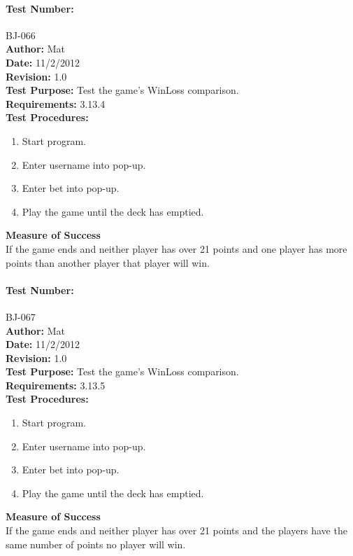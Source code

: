 \documentclass{article}
\begin{document}
\paragraph{Test Number:} BJ-066\\
\textbf{Author:} Mat\\
\textbf{Date:} 11/2/2012\\
\textbf{Revision:} 1.0\\
\textbf{Test Purpose:} Test the game's WinLoss comparison.\\
\textbf{Requirements:} 3.13.4 \\
\textbf{Test Procedures:} 
\begin{enumerate}
\item Start program.
\item Enter username into pop-up.
\item Enter bet into pop-up.
\item Play the game until the deck has emptied.
\end{enumerate}
\textbf{Measure of Success}\\If the game ends and neither player has over 21 points and one player has more points than another player that player will win.
\paragraph{Test Number:} BJ-067\\
\textbf{Author:} Mat\\
\textbf{Date:} 11/2/2012\\
\textbf{Revision:} 1.0\\
\textbf{Test Purpose:} Test the game's WinLoss comparison.\\
\textbf{Requirements:} 3.13.5 \\
\textbf{Test Procedures:} 
\begin{enumerate}
\item Start program.
\item Enter username into pop-up.
\item Enter bet into pop-up.
\item Play the game until the deck has emptied.
\end{enumerate}
\textbf{Measure of Success}\\If the game ends and neither player has over 21 points and the players have the same number of points no player will win.
\end{document}
